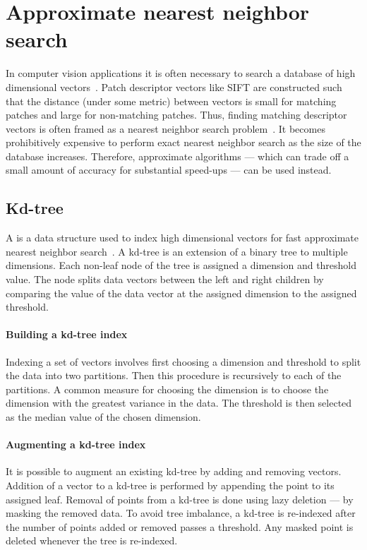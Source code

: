 \section{Approximate nearest neighbor search}\label{sec:ann}  

    In computer vision applications it is often necessary to search a database of high dimensional
    vectors~\cite{shakhnarovich_nearest_neighbor_2006, datar_locality_sensitive_2004, muja_fast_2009,
    kulis_kernelized_2012, weiss_spectral_2009}. Patch descriptor vectors like SIFT are constructed such that the
    distance (under some metric) between vectors is small for matching patches and large for non-matching patches.
    Thus, finding matching descriptor vectors is often framed as a nearest neighbor search
    problem~\cite{lowe_distinctive_2004}. It becomes prohibitively expensive to perform exact nearest neighbor
    search as the size of the database increases. Therefore, approximate algorithms --- which can trade off a small
    amount of accuracy for substantial speed-ups --- can be used instead.

    \subsection{Kd-tree}

        A  is a data structure used to index high dimensional vectors for fast approximate
        nearest neighbor search~\cite{bentley_multidimensional_1975}. A kd-tree is an extension of a binary tree to
        multiple dimensions. Each non-leaf node of the tree is assigned a dimension and threshold value. The node
        splits data vectors between the left and right children by comparing the value of the data vector at the
        assigned dimension to the assigned threshold.

        \paragraph{Building a kd-tree index}
        Indexing a set of vectors involves first choosing a dimension and threshold to split the data into two
        partitions. Then this procedure is recursively to each of the partitions. A common measure for choosing the
        dimension is to choose the dimension with the greatest variance in the data. The threshold is then selected
        as the median value of the chosen dimension.

        \paragraph{Augmenting a kd-tree index}
        It is possible to augment an existing kd-tree by adding and removing vectors. Addition of a vector to a
        kd-tree is performed by appending the point to its assigned leaf. Removal of points from a kd-tree is done
        using lazy deletion --- \ie{} by masking the removed data. To avoid tree imbalance, a kd-tree is re-indexed
        after the number of points added or removed passes a threshold. Any masked point is deleted whenever the
        tree is re-indexed.

